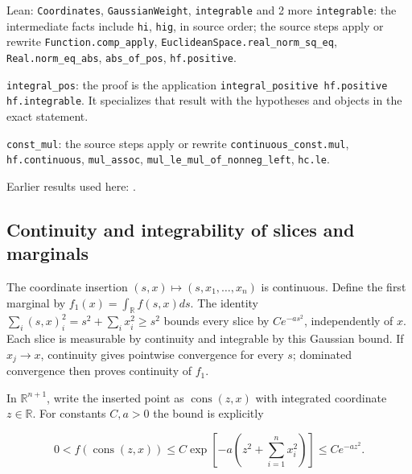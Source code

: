 \documentclass[11pt,a4paper]{report}
\begin{document}
\begin{leanbox}{Lean: \texttt{Coordinates}, \texttt{GaussianWeight}, \texttt{integrable} and 2 more}
\texttt{integrable}: the intermediate facts include \texttt{hi}, \texttt{hig}, in source order; the source steps apply or rewrite \texttt{Function.\allowbreak{}comp\_\allowbreak{}apply}, \texttt{Euclidean\allowbreak{}Space.\allowbreak{}real\_\allowbreak{}norm\_\allowbreak{}sq\_\allowbreak{}eq}, \texttt{Real.\allowbreak{}norm\_\allowbreak{}eq\_\allowbreak{}abs}, \texttt{abs\_\allowbreak{}of\_\allowbreak{}pos}, \texttt{hf.\allowbreak{}positive}.



\texttt{integral\_\allowbreak{}pos}: the proof is the application \texttt{integral\_\allowbreak{}positive hf.\allowbreak{}positive hf.\allowbreak{}integrable}. It specializes that result with the hypotheses and objects in the exact statement.



\texttt{const\_\allowbreak{}mul}: the source steps apply or rewrite \texttt{continuous\_\allowbreak{}const.\allowbreak{}mul}, \texttt{hf.\allowbreak{}continuous}, \texttt{mul\_\allowbreak{}assoc}, \texttt{mul\_\allowbreak{}le\_\allowbreak{}mul\_\allowbreak{}of\_\allowbreak{}nonneg\_\allowbreak{}left}, \texttt{hc.\allowbreak{}le}.
\end{leanbox}


Earlier results used here: \cite[Section~3.26.4]{LangevinLean2026ULASC}.
\subsection{\texorpdfstring{Continuity and integrability of slices and marginals}{Continuity and integrability of slices and marginals}}
\label{report-step-IPLA-PrekopaTensorization-lean-2}


The coordinate insertion \((s,x)\mapsto(s,x_1,\ldots,x_n)\) is continuous. Define the first marginal by \(f_1(x)=\int_\mathbb R f(s,x)ds\). The identity \(\sum_i(s,x)_i^2=s^2+\sum_i x_i^2\ge s^2\) bounds every slice by \(Ce^{-as^2}\), independently of \(x\). Each slice is measurable by continuity and integrable by this Gaussian bound. If \(x_j\to x\), continuity gives pointwise convergence for every \(s\); dominated convergence then proves continuity of \(f_1\).



In \(\mathbb R^{n+1}\), write the inserted point as \(\operatorname{cons}(z,x)\) with integrated coordinate \(z\in\mathbb R\). For constants \(C,a>0\) the bound is explicitly

\[0<f(\operatorname{cons}(z,x))\le C\exp\!\left[-a\left(z^2+\sum_{i=1}^{n}x_i^2\right)\right]\le C e^{-az^2}.\]
\end{document}
